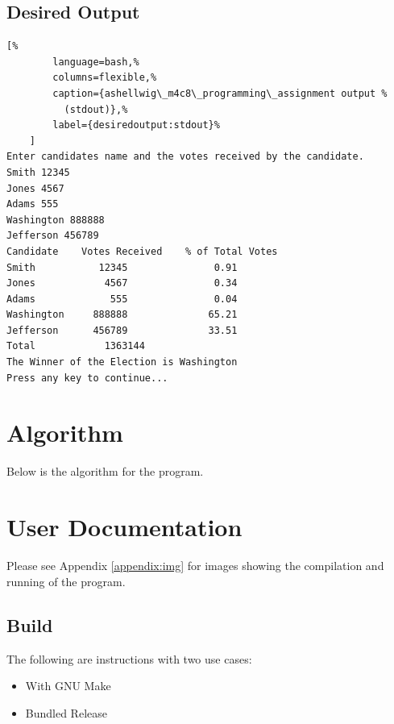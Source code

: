 \documentclass[a4paper, 11pt]{article}
\theoremstyle{definition}
\theoremstyle{plain}
\begin{document}
    \subsection{Desired Output}
      \begin{lstlisting}[%
        language=bash,%
        columns=flexible,%
        caption={ashellwig\_m4c8\_programming\_assignment output %
          (stdout)},%
        label={desiredoutput:stdout}%
    ]
Enter candidates name and the votes received by the candidate.
Smith 12345
Jones 4567
Adams 555
Washington 888888
Jefferson 456789
Candidate    Votes Received    % of Total Votes
Smith           12345               0.91
Jones            4567               0.34
Adams             555               0.04
Washington     888888              65.21
Jefferson      456789              33.51
Total            1363144
The Winner of the Election is Washington
Press any key to continue...
  \end{lstlisting}


  \newpage
  \section{Algorithm}
    Below is the algorithm for the program.

     


  \newpage
  \section{User Documentation}
    Please see Appendix \ref{appendix:img} for images showing the compilation
      and running of the program.

    \subsection{Build}
      The following are instructions with two use cases:
      \begin{itemize}
        \item With GNU Make
        \item Bundled Release
      \end{itemize}
\end{document}
